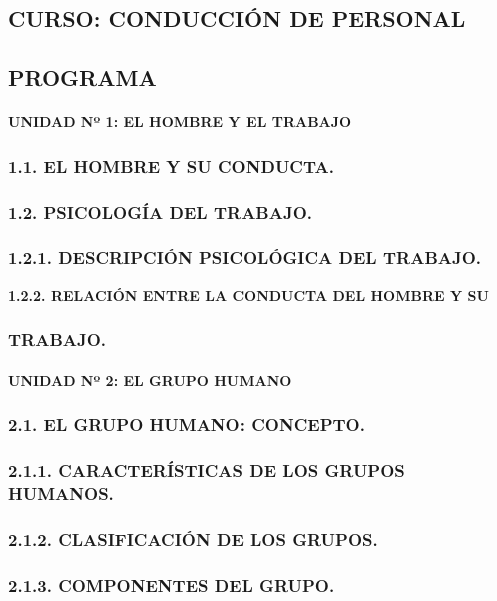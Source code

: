 
\subsection*{CURSO: CONDUCCIÓN DE PERSONAL}
\subsection*{PROGRAMA}
\paragraph*{UNIDAD Nº 1: EL HOMBRE Y EL TRABAJO}
\subsubsection*{1.1. EL HOMBRE Y SU CONDUCTA.}
\subsubsection*{1.2. PSICOLOGÍA DEL TRABAJO.}
\subsubsection*{1.2.1. DESCRIPCIÓN PSICOLÓGICA DEL TRABAJO.}
\textbf{1.2.2. RELACIÓN ENTRE LA CONDUCTA DEL HOMBRE Y SU}

\subsubsection*{TRABAJO.}
\paragraph*{UNIDAD Nº 2: EL GRUPO HUMANO}
\subsubsection*{2.1. EL GRUPO HUMANO: CONCEPTO.}
\subsubsection*{2.1.1. CARACTERÍSTICAS DE LOS GRUPOS HUMANOS.}
\subsubsection*{2.1.2. CLASIFICACIÓN DE LOS GRUPOS.}
\subsubsection*{2.1.3. COMPONENTES DEL GRUPO.}
